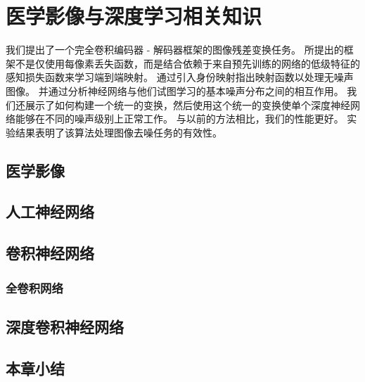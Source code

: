 
\chapter{医学影像与深度学习相关知识}
\label{chap:denoising}

我们提出了一个完全卷积编码器 - 解码器框架的图像残差变换任务。 所提出的框架不是仅使用每像素丢失函数，而是结合依赖于来自预先训练的网络的低级特征的感知损失函数来学习端到端映射。 通过引入身份映射指出映射函数以处理无噪声图像。 并通过分析神经网络与他们试图学习的基本噪声分布之间的相互作用。 我们还展示了如何构建一个统一的变换，然后使用这个统一的变换使单个深度神经网络能够在不同的噪声级别上正常工作。 与以前的方法相比，我们的性能更好。 实验结果表明了该算法处理图像去噪任务的有效性。

\section{医学影像}

 
\section{人工神经网络}

 
\section{卷积神经网络}
\subsection{全卷积网络}
 
\section{深度卷积神经网络}
\section{本章小结}


